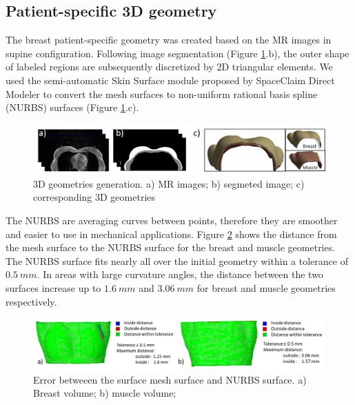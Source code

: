 \subsection{Patient-specific 3D geometry}\label{subsection:patientspecificgeometry}

The breast patient-specific geometry was created based on the MR images in supine configuration. Following image segmentation (Figure \ref{fig:3dgeometries}.b), the outer shape of labeled regions are subsequently discretized by 2D triangular elements.  We used the semi-automatic Skin Surface module proposed by SpaceClaim Direct Modeler to convert the mesh surfaces to non-uniform rational basis spline (NURBS) surfaces (Figure \ref{fig:3dgeometries}.c). 

\begin{figure}[!h]
\centering
\includegraphics[width=\textwidth,keepaspectratio]{figures/3dgeometries.png} 
\caption{3D geometries generation. a) MR images; b) segmeted image; c) corresponding 3D geometries} \label{fig:3dgeometries}
\end{figure}

The NURBS are averaging curves between points, therefore they are smoother and easier to use in mechanical applications. Figure \ref{fig:nurbsVSsurfaceMeshError} shows the distance from the mesh surface to the NURBS surface for the breast and muscle geometries. The NURBS surface fits nearly all over the initial geometry within a tolerance of $0.5\ mm$. In areas with large curvature angles, the distance between the two surfaces increase up to $1.6\ mm$ and $3.06\ mm$ for breast and muscle geometries respectively.
 


\begin{figure}[!h]
\centering
\includegraphics[width=\textwidth,keepaspectratio]{figures/nurbsVSsurfaceMeshError.jpg} 
\caption{Error betweeen the surface mesh surface and NURBS surface. a) Breast volume; b) muscle volume;} \label{fig:nurbsVSsurfaceMeshError}
\end{figure}


